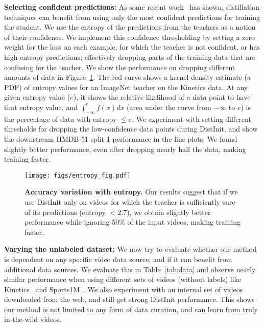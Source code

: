 \documentclass[10pt,twocolumn,letterpaper]{article}
\newcommand{\METHOD}[0]{DistInit}
\begin{document}
{\noindent \bf Selecting confident predictions:}
As some recent work~\cite{radosavovic2018data} has shown, distillation techniques can benefit from using only
the most confident predictions for training the student. We use the entropy of the predictions from the teachers as
a notion of their confidence. 
We implement this confidence thresholding by setting a zero weight for the loss on each example, for which the 
teacher is not confident, or has high-entropy predictions; effectively dropping parts of the training data
that are confusing for the teacher.
We show the performance on dropping different amounts of data in Figure~\ref{fig:entropy}.
The red curve shows a kernel density estimate (a PDF) of entropy values for an ImageNet teacher on the Kinetics data. At any given entropy value ($e$), it shows the relative likelihood of a data point to have that entropy value, and $\int_{-\infty}^{e} f(x)dx$ (area under the curve from $-\infty$ to $e$) is the percentage of data with entropy $\leq e$. We experiment with setting different thresholds for dropping the low-confidence data points during \METHOD{}, and show the downstream HMDB-51 split-1 performance in the line plots.
We found slightly better performance, even after dropping nearly half the data, making training faster.


\begin{figure}[t]
  \centering
  \begin{minipage}[c]{0.45\linewidth}
    \texttt{[image: figs/entropy\_fig.pdf]}
  \end{minipage}\hfill
  \begin{minipage}[c]{0.54\linewidth}
    \caption{
    {\bf Accuracy variation with entropy.}
    Our results suggest that if we use \METHOD{} only on videos for which the teacher is sufficiently sure of its predictions (entropy $< 2.7$), we obtain slightly better performance while ignoring 50\% of the input videos, making training faster.
    }\label{fig:entropy}
  \end{minipage}
\end{figure}

{\noindent \bf Varying the unlabeled dataset:}\label{sec:expt:distill_data}
We now try to evaluate whether our method is dependent on any specific video data source, and if it can benefit from additional
data sources. We evaluate this in Table~\ref{tab:data} and observe nearly similar performance when using
different sets of videos (without labels) like Kinetics~\cite{kay2017kinetics} and Sports1M~\cite{Karpathy_14}.
We also experiment with an internal set of videos downloaded from the web, and still get strong \METHOD{} performance. This shows our method is not limited to any 
form of data curation, and can learn from truly in-the-wild videos.
\end{document}
